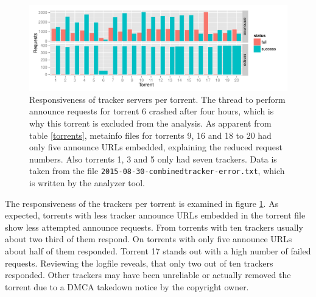 \documentclass[10pt, a4paper, twoside=false, headsepline]{scrbook}
\renewcommand{\_}{\origunderscore\allowbreak}
\begin{document}
\begin{figure}
\centering
\includegraphics[width=\textwidth]{../result/2015-08-30_20-combined_tracker-error}
\caption[Responsiveness of tracker servers per torrent]{Responsiveness of tracker servers per torrent. The thread to perform announce requests for torrent 6 crashed after four hours, which is why this torrent is excluded from the analysis. As apparent from table \ref{torrents}, metainfo files for torrents 9, 16 and 18 to 20 had only five announce URLs embedded, explaining the reduced request numbers. Also torrents 1, 3 and 5 only had seven trackers. Data is taken from the file \texttt{2015-08-30\_20-combined\_tracker-error.txt}, which is written by the analyzer tool.}
\label{tracker-resp}
\end{figure}

The responsiveness of the trackers per torrent is examined in figure \ref{tracker-resp}. As expected, torrents with less tracker announce URLs embedded in the torrent file show less attempted announce requests. From torrents with ten trackers usually about two third of them respond. On torrents with only five announce URLs about half of them responded. Torrent 17 stands out with a high number of failed requests. Reviewing the logfile reveals, that only two out of ten trackers responded. Other trackers may have been unreliable or actually removed the torrent due to a DMCA takedown notice by the copyright owner.
\end{document}

